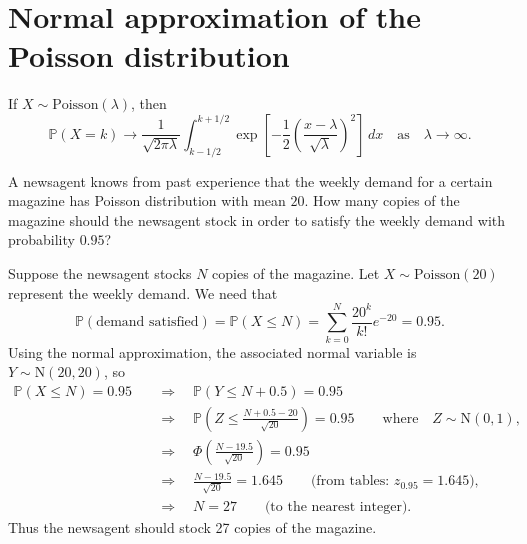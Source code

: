 \documentclass[lecture]{csm}
\newcommand{\prob}{\mathbb{P}}
\newcommand{\proofomitted}{\par[\textit{Proof omitted.}]\par}
\begin{document}
\newpage
\section{Normal approximation of the Poisson distribution}

\begin{theorem}
If $X\sim\text{Poisson}(\lambda)$, then
\[
\prob(X=k)\to \frac{1}{\sqrt{2\pi\lambda}}\int_{k-1/2}^{k+1/2} \exp\left[-\frac{1}{2}\left(\frac{x-\lambda}{\sqrt{\lambda}}\right)^2\right]\,dx 
\quad\text{as}\quad \lambda\to\infty.
\]
\end{theorem}
\proofomitted

\begin{example}
A newsagent knows from past experience that the weekly demand for a certain magazine has Poisson distribution with mean $20$. How many copies of the magazine should the newsagent stock in order to satisfy the weekly demand with probability $0.95$?
\end{example}

\newpage

\begin{solution}
Suppose the newsagent stocks $N$ copies of the magazine. Let $X\sim\text{Poisson}(20)$ represent the weekly demand. We need that 
\[
\prob(\text{demand satisfied}) = \prob(X\leq N) = \sum_{k=0}^{N}\frac{20^k}{k!}e^{-20} = 0.95.
\]
Using the normal approximation, the associated normal variable is $Y\sim\text{N}(20,20)$, so 
\begin{align*}
\prob(X\leq N) = 0.95
	& \quad\Rightarrow\quad \prob(Y \leq N + 0.5) = 0.95 \\
	& \quad\Rightarrow\quad \prob\left(Z \leq \frac{N + 0.5 - 20}{\sqrt{20}}\right) = 0.95 \qquad\text{where}\quad Z\sim\text{N}(0,1), \\
	& \quad\Rightarrow\quad \Phi\left(\frac{N -19.5}{\sqrt{20}}\right) = 0.95 \\
	& \quad\Rightarrow\quad \frac{N -19.5}{\sqrt{20}} = 1.645 \qquad\text{(from tables: $z_{0.95} = 1.645$)},\\
	& \quad\Rightarrow\quad N = 27 \qquad\text{(to the nearest integer)}.
\end{align*}
Thus the newsagent should stock 27 copies of the magazine.
\end{solution}


\end{document}

